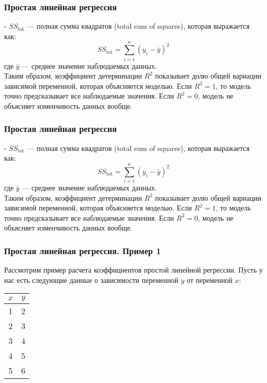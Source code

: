 \documentclass[aspectratio=169]{beamer}
\begin{document}
\begin{frame}
\frametitle{Простая линейная регрессия}
- \( SS_{\text{tot}} \) — полная сумма квадратов (total sum of squares), которая выражается как:
\[
SS_{\text{tot}} = \sum_{i=1}^{n} (y_i - \bar{y})^2
\]
где \( \bar{y} \) — среднее значение наблюдаемых данных.
\newline\\
Таким образом, коэффициент детерминации \( R^2 \) показывает долю общей вариации зависимой переменной, которая объясняется моделью. Если \( R^2 = 1 \), то модель точно предсказывает все наблюдаемые значения. Если \( R^2 = 0 \), модель не объясняет изменчивость данных вообще.
\end{frame}

\begin{frame}
\frametitle{Простая линейная регрессия}
- \( SS_{\text{tot}} \) — полная сумма квадратов (total sum of squares), которая выражается как:
\[
SS_{\text{tot}} = \sum_{i=1}^{n} (y_i - \bar{y})^2
\]
где \( \bar{y} \) — среднее значение наблюдаемых данных.
\newline\\
Таким образом, коэффициент детерминации \( R^2 \) показывает долю общей вариации зависимой переменной, которая объясняется моделью. Если \( R^2 = 1 \), то модель точно предсказывает все наблюдаемые значения. Если \( R^2 = 0 \), модель не объясняет изменчивость данных вообще.
\end{frame}

\begin{frame}
\frametitle{Простая линейная регрессия. Пример 1}
Рассмотрим пример расчета коэффициентов простой линейной регрессии. Пусть у нас есть следующие данные о зависимости переменной \( y \) от переменной \( x \):
\begin{center}
\begin{tabular}{ |c|c| } 
 \hline
 \( x \) & \( y \)\\ 
 \hline
 1 & 2\\
 \hline
 2 & 3\\
 \hline
 3 & 4\\
 \hline
 4 & 5\\
 \hline
 5 & 6\\
 \hline
\end{tabular}
\end{center}
\end{frame}
\end{document}

